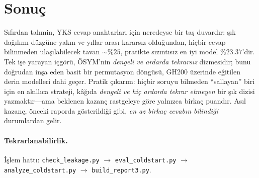 \documentclass[11pt]{article}
\begin{document}
\section{Sonuç}
Sıfırdan tahmin, YKS cevap anahtarları için neredeyse bir taş duvardır: şık
dağılımı düzgüne yakın ve yıllar arası kararsız olduğundan, hiçbir cevap
bilinmeden ulaşılabilecek tavan $\sim\%25$, pratikte sızıntısız en iyi model
$\%23.37$'dir. Tek işe yarayan içgörü, ÖSYM'nin \emph{dengeli ve ardarda
tekrarsız} dizmesidir; bunu doğrudan inşa eden basit bir permutasyon döngüsü,
GH200 üzerinde eğitilen derin modelleri dahi geçer. Pratik çıkarım: hiçbir
soruyu bilmeden ``sallayan'' biri için en akıllıca strateji, kâğıda
\emph{dengeli ve hiç ardarda tekrar etmeyen} bir şık dizisi yazmaktır---ama
beklenen kazanç rastgeleye göre yalnızca birkaç puandır. Asıl kazanç, önceki
raporda gösterildiği gibi, \emph{en az birkaç cevabın bilindiği} durumlardan
gelir.

\paragraph{Tekrarlanabilirlik.} İşlem hattı: \texttt{check\_leakage.py}
$\rightarrow$ \texttt{eval\_coldstart.py} $\rightarrow$
\texttt{analyze\_coldstart.py} $\rightarrow$ \texttt{build\_report3.py}.
\end{document}
